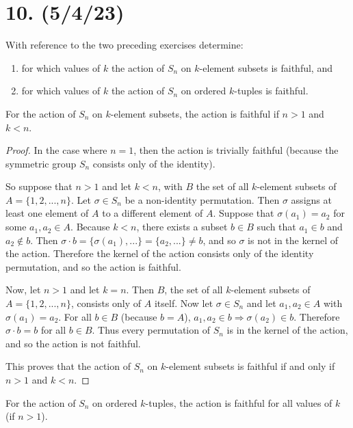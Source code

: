 \documentclass{article}
\begin{document}
\section*{10. (5/4/23)}

With reference to the two preceding exercises determine:

\begin{enumerate}[label=(\alph*)]
  \item for which values of $k$ the action of $S_n$ on $k$-element subsets is faithful, and
  \item for which values of $k$ the action of $S_n$ on ordered $k$-tuples is faithful.
\end{enumerate}

For the action of $S_n$ on $k$-element subsets, the action is faithful if $n > 1$ and $k < n$.
\begin{proof}
  In the case where $n = 1$, then the action is trivially faithful (because the symmetric group $S_n$ consists only of the identity).
  
  So suppose that $n > 1$ and let $k < n$, with $B$ the set of all $k$-element subsets of $A = \{ 1, 2, ..., n \}$. Let $\sigma \in S_n$ be a non-identity permutation. Then $\sigma$ assigns at least one element of $A$ to a different element of $A$. Suppose that $\sigma(a_1) = a_2$ for some $a_1, a_2 \in A$. Because $k < n$, there exists a subset $b \in B$ such that $a_1 \in b$ and $a_2 \notin b$. Then $\sigma \cdot b = \{ \sigma(a_1), ... \} = \{ a_2, ... \} \neq b$, and so $\sigma$ is not in the kernel of the action. Therefore the kernel of the action consists only of the identity permutation, and so the action is faithful.

  Now, let $n > 1$ and let $k = n$. Then $B$, the set of all $k$-element subsets of $A = \{ 1, 2, ..., n \}$, consists only of $A$ itself. Now let $\sigma \in S_n$ and let $a_1, a_2 \in A$ with $\sigma(a_1) = a_2$. For all $b \in B$ (because $b = A$), $a_1, a_2 \in b \Rightarrow \sigma(a_2) \in b$. Therefore $\sigma \cdot b = b$ for all $b \in B$. Thus every permutation of $S_n$ is in the kernel of the action, and so the action is not faithful.

  This proves that the action of $S_n$ on $k$-element subsets is faithful if and only if $n > 1$ and $k < n$.
\end{proof}

For the action of $S_n$ on ordered $k$-tuples, the action is faithful for all values of $k$ (if $n > 1$).
\end{document}
